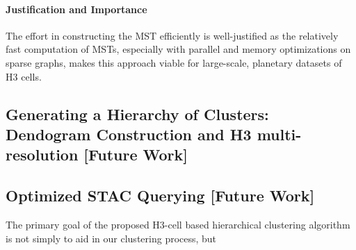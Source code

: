 \begin{multicols}{2}
\paragraph{Justification and Importance}
The effort in constructing the MST efficiently is well-justified as the relatively fast computation of MSTs, especially with parallel and memory optimizations on sparse graphs, makes this approach viable for large-scale, planetary datasets of H3 cells.



\subsection{Generating a Hierarchy of Clusters: Dendogram Construction and H3 multi-resolution [Future Work]}


\subsection{Optimized STAC Querying [Future Work]}
The primary goal of the proposed H3-cell based hierarchical clustering algorithm is not simply to aid in our clustering process, but




\end{multicols}
